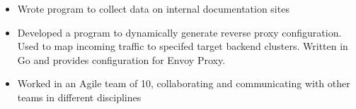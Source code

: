 \documentclass[10pt,a4paper,ragged2e,withhyper]{altacv}
\begin{document}


\begin{paracol}{2}

\tagline{}


\makecvheader


\begin{itemize}
    \item Wrote program to collect data on internal documentation sites

    \item Developed a program to dynamically generate reverse proxy configuration.  Used to map incoming traffic to specifed target backend clusters.  Written in Go and provides configuration for Envoy Proxy.
    
    \item Worked in an Agile team of 10, collaborating and communicating with other teams in different disciplines
    
\end{itemize}


\end{paracol}
\end{document}
